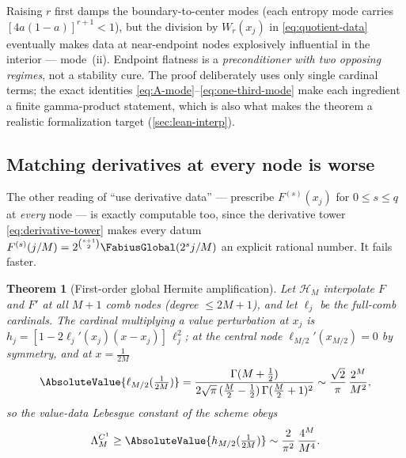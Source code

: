 \documentclass[11pt,oneside]{article}
\numberwithin{equation}{section}
\newtheorem{theorem}{Theorem}[section]
\theoremstyle{definition}
\theoremstyle{remark}
\begin{document}
\begin{remark}
Raising $r$ first damps the boundary-to-center modes (each entropy
mode carries $[4a(1-a)]^{r+1}<1$), but the division by
$W_r(x_j)$ in \eqref{eq:quotient-data} eventually makes data at
near-endpoint nodes explosively influential in the interior ---
mode~(ii).  Endpoint flatness is a \emph{preconditioner with two
opposing regimes}, not a stability cure.  The proof deliberately uses
only single cardinal terms; the exact identities
\eqref{eq:A-mode}--\eqref{eq:one-third-mode} make each ingredient a
finite gamma-product statement, which is also what makes the theorem
a realistic formalization target
(\cref{sec:lean-interp}).
\end{remark}

\subsection{Matching derivatives at every node is worse}
\label{sec:full-hermite}

The other reading of ``use derivative data'' --- prescribe
$F^{(s)}(x_j)$ for $0\le s\le q$ at \emph{every} node --- is exactly
computable too, since the derivative tower \eqref{eq:derivative-tower}
makes every datum $F^{(s)}(j/M)=2^{\binom{s+1}2}
\FabiusGlobal(2^{s}j/M)$ an explicit rational number.  It fails faster.

\begin{theorem}[First-order global Hermite amplification]
\label{thm:global-hermite}
Let $\mathcal H_M$ interpolate $F$ and $F'$ at all $M+1$ comb nodes
(degree $\le2M+1$), and let $\ell_j$ be the full-comb cardinals.  The
cardinal multiplying a value perturbation at $x_j$ is
$h_j=[1-2\ell_j'(x_j)(x-x_j)]\,\ell_j^{2}$; at the central node
$\ell_{M/2}'(x_{M/2})=0$ by symmetry, and at $x=\tfrac1{2M}$
\begin{equation}
 \AbsoluteValue{\ell_{M/2}(\tfrac1{2M})}
 =\frac{\Gamma(M+\tfrac12)}
 {2\sqrt\pi\,(\tfrac M2-\tfrac12)\,\Gamma(\tfrac M2+1)^{2}}
 \sim\frac{\sqrt2}{\pi}\,\frac{2^{M}}{M^{2}},
 \label{eq:full-central-cardinal}
\end{equation}
so the value-data Lebesgue constant of the scheme obeys
\begin{equation}
 \Lambda^{C^{1}}_M
 \ge\AbsoluteValue{h_{M/2}(\tfrac1{2M})}
 \sim\frac{2}{\pi^{2}}\,\frac{4^{M}}{M^{4}}.
 \label{eq:hermite-square}
\end{equation}
\end{theorem}
\end{document}
